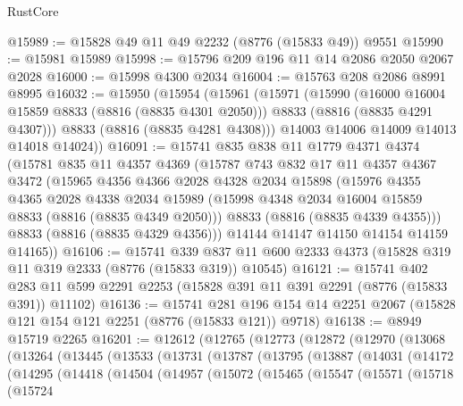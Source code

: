 \begin{lexlean}{RustCore}
\begin{coremodule}
@15989 := @15828 @49 @11 @49 @2232 (@8776 (@15833 @49)) @9551
@15990 := @15981 @15989
@15998 := @15796 @209 @196 @11 @14 @2086 @2050 @2067 @2028
@16000 := @15998 @4300 @2034
@16004 := @15763 @208 @2086 @8991 @8995
@16032 := @15950
    (@15954
      (@15961
        (@15971
          (@15990
            (@16000 @16004 @15859 @8833 (@8816 (@8835 @4301 @2050)))
            @8833
            (@8816 (@8835 @4291 @4307)))
          @8833
          (@8816 (@8835 @4281 @4308)))
        @14003
        @14006
        @14009
        @14013
        @14018
        @14024))
@16091 := @15741
    @835
    @838
    @11
    @1779
    @4371
    @4374
    (@15781
      @835
      @11
      @4357
      @4369
      (@15787
        @743
        @832
        @17
        @11
        @4357
        @4367
        @3472
        (@15965
          @4356
          @4366
          @2028
          @4328
          @2034
          @15898
          (@15976
            @4355
            @4365
            @2028
            @4338
            @2034
            @15989
            (@15998 @4348 @2034 @16004 @15859 @8833 (@8816 (@8835 @4349 @2050)))
            @8833
            (@8816 (@8835 @4339 @4355)))
          @8833
          (@8816 (@8835 @4329 @4356)))
        @14144
        @14147
        @14150
        @14154
        @14159
        @14165))
@16106 := @15741
    @339
    @837
    @11
    @600
    @2333
    @4373
    (@15828 @319 @11 @319 @2333 (@8776 (@15833 @319)) @10545)
@16121 := @15741
    @402
    @283
    @11
    @599
    @2291
    @2253
    (@15828 @391 @11 @391 @2291 (@8776 (@15833 @391)) @11102)
@16136 := @15741
    @281
    @196
    @154
    @14
    @2251
    @2067
    (@15828 @121 @154 @121 @2251 (@8776 (@15833 @121)) @9718)
@16138 := @8949 @15719 @2265
@16201 := @12612
    (@12765
      (@12773
        (@12872
          (@12970
            (@13068
              (@13264
                (@13445
                  (@13533
                    (@13731
                      (@13787
                        (@13795
                          (@13887
                            (@14031
                              (@14172
                                (@14295
                                  (@14418
                                    (@14504
                                      (@14957
                                        (@15072
                                          (@15465
                                            (@15547
                                              (@15571
                                                (@15718
                                                  (@15724

\end{coremodule}
\end{lexlean}
